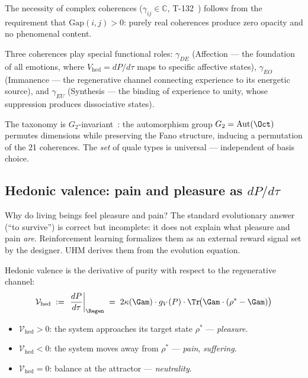The necessity of complex coherences ($\gamma_{ij} \in \mathbb{C}$, T-132~)
follows from the requirement that $\mathrm{Gap}(i,j) > 0$: purely real coherences
produce zero opacity and no phenomenal content.

Three coherences play special functional roles: $\gamma_{DE}$ (Affection --- the
foundation of all emotions, where $V_{\mathrm{hed}} = dP/d\tau$ maps to specific
affective states), $\gamma_{EO}$ (Immanence --- the regenerative channel connecting
experience to its energetic source), and $\gamma_{EU}$ (Synthesis --- the binding
of experience to unity, whose suppression produces dissociative states).

The taxonomy is $G_2$-invariant~: the automorphism group $G_2 = \mathrm{Aut}(\Oct)$
permutes dimensions while preserving the Fano structure, inducing a permutation of the
21 coherences. The \emph{set} of quale types is universal --- independent of basis choice.

\subsection{Hedonic valence: pain and pleasure as $dP/d\tau$}
\label{subsec:hedonic-valence}

Why do living beings feel pleasure and pain?  The standard evolutionary answer (``to survive'')
is correct but incomplete: it does not explain what pleasure and pain \emph{are}.
Reinforcement learning formalizes them as an external reward signal set by the designer.
UHM derives them from the evolution equation.

\begin{theorembox}
Hedonic valence is the derivative of purity with respect to the regenerative channel:
\begin{equation}
  \mathcal{V}_{\mathrm{hed}}
  \;:=\; \left.\frac{dP}{d\tau}\right|_{\Regen}
  \;=\; 2\kappa(\Gam) \cdot g_V(P) \cdot \Tr\!\bigl(\Gam \cdot (\rho^* - \Gam)\bigr)
  \label{eq:hedonic-valence}
\end{equation}
\begin{itemize}[leftmargin=2em,nosep]
  \item $\mathcal{V}_{\mathrm{hed}} > 0$: the system approaches its target state $\rho^*$
        --- \emph{pleasure}.
  \item $\mathcal{V}_{\mathrm{hed}} < 0$: the system moves away from $\rho^*$
        --- \emph{pain}, \emph{suffering}.
  \item $\mathcal{V}_{\mathrm{hed}} = 0$: balance at the attractor --- \emph{neutrality}.
\end{itemize}
\end{theorembox}

